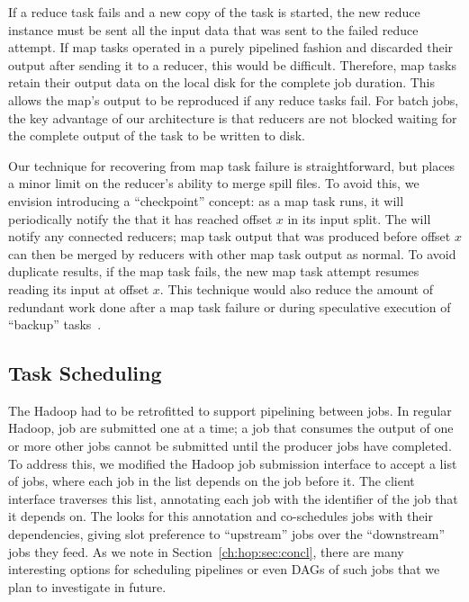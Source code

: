 If a reduce task fails and a new copy of the task is started, the new
reduce instance must be sent all the input data that was sent to the
failed reduce attempt. If map tasks operated in a purely pipelined
fashion and discarded their output after sending it to a reducer, this
would be difficult. Therefore, map tasks retain their output data on
the local disk for the complete job duration. This allows the map's output to be 
reproduced if any reduce tasks fail. For batch jobs, the key advantage of our architecture is
that reducers are not blocked waiting for the complete output of the
task to be written to disk.

Our technique for recovering from map task failure is straightforward, but
places a minor limit on the reducer's ability to merge spill files. To avoid
this, we envision introducing a ``checkpoint'' concept: as a map task runs, it
will periodically notify the {\JT} that it has reached offset $x$ in its input
split. The {\JT} will notify any connected reducers; map task output that was
produced before offset $x$ can then be merged by reducers with other map task
output as normal. To avoid duplicate results, if the map task fails, the new map
task attempt resumes reading its input at offset $x$. This technique would also
reduce the amount of redundant work done after a map task failure or during
speculative execution of ``backup'' tasks~\cite{mapreduce-osdi}.

\subsection{Task Scheduling}
\label{ch:hop:sec:pipeline-sched}

The Hadoop {\JT} had to be retrofitted to support pipelining between jobs. In
regular Hadoop, job are submitted one at a time; a job that consumes the output
of one or more other jobs cannot be submitted until the producer jobs have
completed. To address this, we modified the Hadoop job submission interface to
accept a list of jobs, where each job in the list depends on the job before
it. The client interface traverses this list, annotating each job with the
identifier of the job that it depends on. The {\JT} looks for this annotation
and co-schedules jobs with their dependencies, giving slot preference to
``upstream'' jobs over the ``downstream'' jobs they feed.  As we note in
Section~\ref{ch:hop:sec:concl}, there are many interesting options for scheduling
pipelines or even DAGs of such jobs that we plan to investigate in future.

